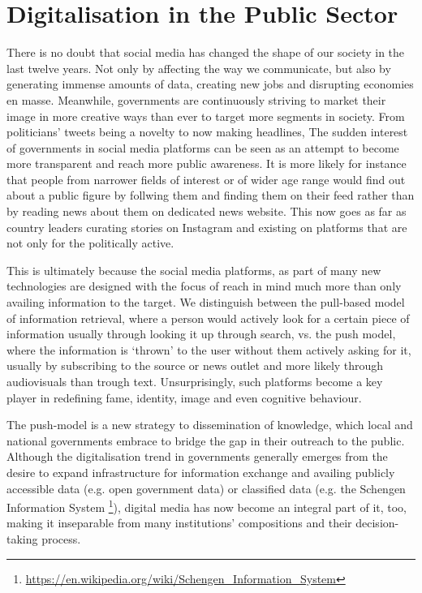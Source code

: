 
\section{Digitalisation in the Public Sector}

There is no doubt that social media has changed the shape of our society in the last twelve years. Not only by affecting the way we communicate, but also by generating immense amounts of data, creating new jobs and disrupting economies en masse.
Meanwhile, governments are continuously striving to market their image in more creative ways than ever to target more segments in society. From politicians' tweets being a novelty to now making headlines, The sudden interest of governments in social media platforms 
can be seen as an attempt to become more transparent and reach more public awareness. It is more likely for instance that people from narrower fields of interest or of wider age range
would find out about a public figure by follwing them and finding them on their feed
rather than by reading news about them on dedicated news website.
This now goes as far as country leaders curating stories on Instagram and existing on platforms that are not only for the politically active.


This is ultimately because the social media platforms, as part of many new technologies are designed with the focus of reach in mind much more than only availing information to the target.
We distinguish between the pull-based model of information retrieval, where a person would actively look for a certain piece of information usually through looking it up through search, vs. the push model, where the information is `thrown' to the user without them actively asking for it, usually by subscribing to the source or news outlet and more likely through audiovisuals than trough text. Unsurprisingly, such platforms become a key player in redefining fame, identity, image and even cognitive behaviour.

The push-model is a new strategy to dissemination of knowledge, which local and national governments %
embrace \cite{forbes:govOutreach} to bridge the gap in their outreach to the public. 
Although the digitalisation trend in governments generally emerges from the desire to expand infrastructure for information exchange and availing publicly accessible data (e.g. open government data) \cite{un:egovReport} or classified data (e.g. the Schengen Information System \footnote{\url{https://en.wikipedia.org/wiki/Schengen_Information_System}}), digital media has now become an integral part of it, too, making it inseparable from many institutions' compositions and their decision-taking process. 


